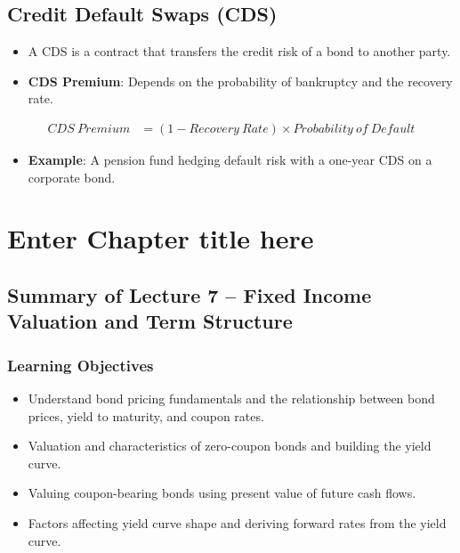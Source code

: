 \documentclass[
]{book}
\providecommand{\tightlist}{%
  \setlength{\itemsep}{0pt}\setlength{\parskip}{0pt}}
\begin{document}
\hypertarget{credit-default-swaps-cds}{%
\section{Credit Default Swaps (CDS)}\label{credit-default-swaps-cds}}

\begin{itemize}
\tightlist
\item
  A CDS is a contract that transfers the credit risk of a bond to another party.
\item
  \textbf{CDS Premium}: Depends on the probability of bankruptcy and the recovery rate.
\end{itemize}

\[
\begin{align}
CDS \ Premium &= (1 - Recovery \ Rate) \times Probability \ of \ Default
\end{align}
\]

\begin{itemize}
\tightlist
\item
  \textbf{Example}: A pension fund hedging default risk with a one-year CDS on a corporate bond.
\end{itemize}

\hypertarget{ch7}{%
\chapter{Enter Chapter title here}\label{ch7}}

\hypertarget{summary-of-lecture-7-fixed-income-valuation-and-term-structure}{%
\section{Summary of Lecture 7 -- Fixed Income Valuation and Term Structure}\label{summary-of-lecture-7-fixed-income-valuation-and-term-structure}}

\hypertarget{learning-objectives-1}{%
\subsection{Learning Objectives}\label{learning-objectives-1}}

\begin{itemize}
\tightlist
\item
  Understand bond pricing fundamentals and the relationship between bond prices, yield to maturity, and coupon rates.
\item
  Valuation and characteristics of zero-coupon bonds and building the yield curve.
\item
  Valuing coupon-bearing bonds using present value of future cash flows.
\item
  Factors affecting yield curve shape and deriving forward rates from the yield curve.
\end{itemize}
\end{document}
